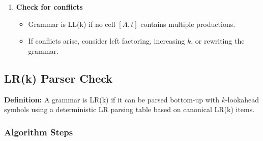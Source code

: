 \begin{enumerate}
    \item \textbf{Check for conflicts}
    \begin{itemize}
        \item Grammar is LL(k) if no cell \( [A, t] \) contains multiple productions.
        \item If conflicts arise, consider left factoring, increasing \( k \), or rewriting the grammar.
    \end{itemize}
\end{enumerate}

\subsection{LR(k) Parser Check}

\textbf{Definition:} A grammar is LR(k) if it can be parsed bottom-up with \( k \)-lookahead symbols using a deterministic LR parsing table based on canonical LR(k) items.

\subsubsection{Algorithm Steps}

